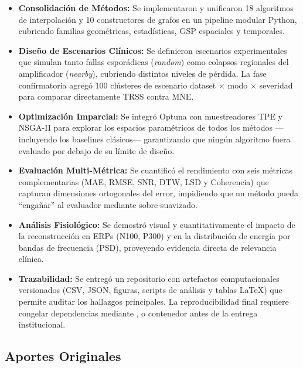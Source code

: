 \begin{itemize}
    \item \textbf{Consolidación de Métodos:} Se implementaron y unificaron 18 algoritmos de interpolación y 10 constructores de grafos en un pipeline modular Python, cubriendo familias geométricas, estadísticas, GSP espaciales y temporales.

    \item \textbf{Diseño de Escenarios Clínicos:} Se definieron escenarios experimentales que simulan tanto fallas esporádicas (\textit{random}) como colapsos regionales del amplificador (\textit{nearby}), cubriendo distintos niveles de pérdida. La fase confirmatoria agregó 100 clústeres de escenario dataset $\times$ modo $\times$ severidad para comparar directamente TRSS contra MNE.

    \item \textbf{Optimización Imparcial:} Se integró Optuna con muestreadores TPE y NSGA-II para explorar los espacios paramétricos de todos los métodos ---incluyendo los baselines clásicos--- garantizando que ningún algoritmo fuera evaluado por debajo de su límite de diseño.

    \item \textbf{Evaluación Multi-Métrica:} Se cuantificó el rendimiento con seis métricas complementarias (MAE, RMSE, SNR, DTW, LSD y Coherencia) que capturan dimensiones ortogonales del error, impidiendo que un método pueda ``engañar'' al evaluador mediante sobre-suavizado.

    \item \textbf{Análisis Fisiológico:} Se demostró visual y cuantitativamente el impacto de la reconstrucción en ERPs (N100, P300) y en la distribución de energía por bandas de frecuencia (PSD), proveyendo evidencia directa de relevancia clínica.

    \item \textbf{Trazabilidad:} Se entregó un repositorio con artefactos computacionales versionados (CSV, JSON, figuras, scripts de análisis y tablas LaTeX) que permite auditar los hallazgos principales. La reproducibilidad final requiere congelar dependencias mediante ,  o contenedor antes de la entrega institucional.
\end{itemize}

\subsection{Aportes Originales}

